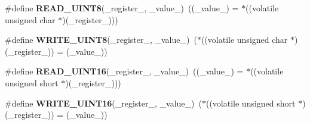 \begin{DoxyCompactItemize}
\#define {\bfseries R\+E\+A\+D\+\_\+\+U\+I\+N\+T8}(\+\_\+register\+\_\+,  \+\_\+value\+\_\+)~((\+\_\+value\+\_\+) = $\ast$((volatile unsigned char $\ast$)(\+\_\+register\+\_\+)))
\item 
\mbox{\label{group__RTEMSBSPsMIPSMalta_ga01500b2335aceb257ce6f7ecab5f4f05}} 
\#define {\bfseries W\+R\+I\+T\+E\+\_\+\+U\+I\+N\+T8}(\+\_\+register\+\_\+,  \+\_\+value\+\_\+)~($\ast$((volatile unsigned char $\ast$)(\+\_\+register\+\_\+)) = (\+\_\+value\+\_\+))
\item 
\mbox{\label{group__RTEMSBSPsMIPSMalta_gab734ae5f64ddf286621e4099376bc11c}} 
\#define {\bfseries R\+E\+A\+D\+\_\+\+U\+I\+N\+T16}(\+\_\+register\+\_\+,  \+\_\+value\+\_\+)~((\+\_\+value\+\_\+) = $\ast$((volatile unsigned short $\ast$)(\+\_\+register\+\_\+)))
\item 
\mbox{\label{group__RTEMSBSPsMIPSMalta_gaa142bf459ae3b751c5666344d104c799}} 
\#define {\bfseries W\+R\+I\+T\+E\+\_\+\+U\+I\+N\+T16}(\+\_\+register\+\_\+,  \+\_\+value\+\_\+)~($\ast$((volatile unsigned short $\ast$)(\+\_\+register\+\_\+)) = (\+\_\+value\+\_\+))
\end{DoxyCompactItemize}
